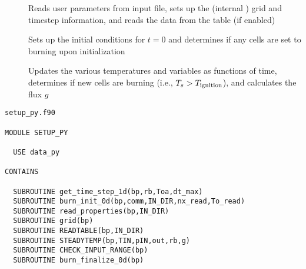 \begin{description}
\item[]{Reads user parameters from input file, sets up the (internal \Rocburn) grid and timestep information, and reads the data from the table (if enabled)}
\item[]{Sets up the initial conditions for $t=0$ and determines if any cells are set to burning upon initialization}
\item[]{Updates the various temperatures and variables as functions of time, determines if new cells are burning (i.e., $T_s > T_{\rm ignition}$), and calculates the flux $g$}
\end{description}


\begin{Verbatim}[frame=single]
                              setup_py.f90

MODULE SETUP_PY

  USE data_py

CONTAINS

  SUBROUTINE get_time_step_1d(bp,rb,Toa,dt_max)
  SUBROUTINE burn_init_0d(bp,comm,IN_DIR,nx_read,To_read)
  SUBROUTINE read_properties(bp,IN_DIR)
  SUBROUTINE grid(bp)
  SUBROUTINE READTABLE(bp,IN_DIR)
  SUBROUTINE STEADYTEMP(bp,TIN,pIN,out,rb,g)
  SUBROUTINE CHECK_INPUT_RANGE(bp)
  SUBROUTINE burn_finalize_0d(bp)
\end{Verbatim}

